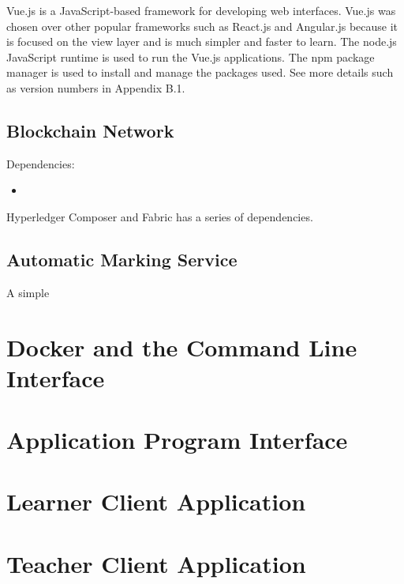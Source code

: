 Vue.js is a JavaScript-based framework for developing web interfaces. Vue.js was chosen over other 
popular frameworks such as React.js and Angular.js because it is focused on the view layer and is much 
simpler and faster to learn. The node.js JavaScript runtime is used to run the Vue.js applications. The npm package manager 
is used to install and manage the packages used. See more details such as version numbers in Appendix B.1.

\subsection{Blockchain Network}
Dependencies:
\begin{itemize}
    \item 
\end{itemize}
Hyperledger Composer and Fabric has a series of dependencies. 

\subsection{Automatic Marking Service}

A simple 

\section{Docker and the Command Line Interface}

\section{Application Program Interface}

\section{Learner Client Application}

\section{Teacher Client Application}

